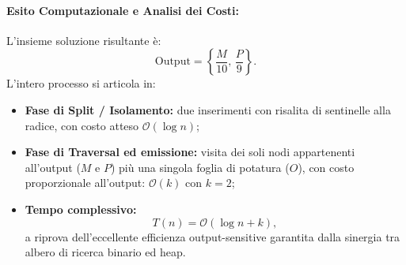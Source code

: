 \paragraph{Esito Computazionale e Analisi dei Costi:}
L'insieme soluzione risultante \`e:
\begin{equation}
  \text{Output} = \left\{ \frac{M}{10}, \, \frac{P}{9} \right\}.
\end{equation}
L'intero processo si articola in:
\begin{itemize}
    \item \textbf{Fase di Split / Isolamento:} due inserimenti con risalita di sentinelle alla radice, con costo atteso $\mathcal{O}(\log n)$;
    \item \textbf{Fase di Traversal ed emissione:} visita dei soli nodi appartenenti all'output ($M$ e $P$) pi\`u una singola foglia di potatura ($O$), con costo proporzionale all'output: $\mathcal{O}(k)$ con $k = 2$;
    \item \textbf{Tempo complessivo:}
    \begin{equation}
      T(n) = \mathcal{O}(\log n + k),
    \end{equation}
    a riprova dell'eccellente efficienza output-sensitive garantita dalla sinergia tra albero di ricerca binario ed heap.
\end{itemize}


